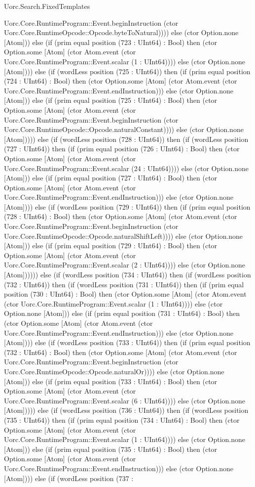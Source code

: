 \begin{lexlean}{Uorc.Search.FixedTemplates}
\begin{semanticmodule}
{Uorc.Core.RuntimeProgram::Event.beginInstruction (ctor Uorc.Core.RuntimeOpcode::Opcode.byteToNatural)))) else (ctor Option.none [Atom])) else (if (prim equal position (723 : UInt64) : Bool) then (ctor Option.some [Atom] (ctor Atom.event (ctor Uorc.Core.RuntimeProgram::Event.scalar (1 : UInt64)))) else (ctor Option.none [Atom]))) else (if (wordLess position (725 : UInt64)) then (if (prim equal position (724 : UInt64) : Bool) then (ctor Option.some [Atom] (ctor Atom.event (ctor Uorc.Core.RuntimeProgram::Event.endInstruction))) else (ctor Option.none [Atom])) else (if (prim equal position (725 : UInt64) : Bool) then (ctor Option.some [Atom] (ctor Atom.event (ctor Uorc.Core.RuntimeProgram::Event.beginInstruction (ctor Uorc.Core.RuntimeOpcode::Opcode.naturalConstant)))) else (ctor Option.none [Atom])))) else (if (wordLess position (728 : UInt64)) then (if (wordLess position (727 : UInt64)) then (if (prim equal position (726 : UInt64) : Bool) then (ctor Option.some [Atom] (ctor Atom.event (ctor Uorc.Core.RuntimeProgram::Event.scalar (24 : UInt64)))) else (ctor Option.none [Atom])) else (if (prim equal position (727 : UInt64) : Bool) then (ctor Option.some [Atom] (ctor Atom.event (ctor Uorc.Core.RuntimeProgram::Event.endInstruction))) else (ctor Option.none [Atom]))) else (if (wordLess position (729 : UInt64)) then (if (prim equal position (728 : UInt64) : Bool) then (ctor Option.some [Atom] (ctor Atom.event (ctor Uorc.Core.RuntimeProgram::Event.beginInstruction (ctor Uorc.Core.RuntimeOpcode::Opcode.naturalShiftLeft)))) else (ctor Option.none [Atom])) else (if (prim equal position (729 : UInt64) : Bool) then (ctor Option.some [Atom] (ctor Atom.event (ctor Uorc.Core.RuntimeProgram::Event.scalar (2 : UInt64)))) else (ctor Option.none [Atom]))))) else (if (wordLess position (734 : UInt64)) then (if (wordLess position (732 : UInt64)) then (if (wordLess position (731 : UInt64)) then (if (prim equal position (730 : UInt64) : Bool) then (ctor Option.some [Atom] (ctor Atom.event (ctor Uorc.Core.RuntimeProgram::Event.scalar (1 : UInt64)))) else (ctor Option.none [Atom])) else (if (prim equal position (731 : UInt64) : Bool) then (ctor Option.some [Atom] (ctor Atom.event (ctor Uorc.Core.RuntimeProgram::Event.endInstruction))) else (ctor Option.none [Atom]))) else (if (wordLess position (733 : UInt64)) then (if (prim equal position (732 : UInt64) : Bool) then (ctor Option.some [Atom] (ctor Atom.event (ctor Uorc.Core.RuntimeProgram::Event.beginInstruction (ctor Uorc.Core.RuntimeOpcode::Opcode.naturalOr)))) else (ctor Option.none [Atom])) else (if (prim equal position (733 : UInt64) : Bool) then (ctor Option.some [Atom] (ctor Atom.event (ctor Uorc.Core.RuntimeProgram::Event.scalar (6 : UInt64)))) else (ctor Option.none [Atom])))) else (if (wordLess position (736 : UInt64)) then (if (wordLess position (735 : UInt64)) then (if (prim equal position (734 : UInt64) : Bool) then (ctor Option.some [Atom] (ctor Atom.event (ctor Uorc.Core.RuntimeProgram::Event.scalar (1 : UInt64)))) else (ctor Option.none [Atom])) else (if (prim equal position (735 : UInt64) : Bool) then (ctor Option.some [Atom] (ctor Atom.event (ctor Uorc.Core.RuntimeProgram::Event.endInstruction))) else (ctor Option.none [Atom]))) else (if (wordLess position (737 : }
\end{semanticmodule}
\end{lexlean}
